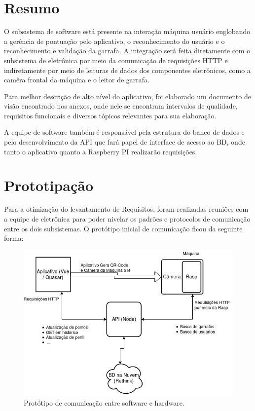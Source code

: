 \section{Resumo}
O subsistema de software está presente na interação máquina usuário englobando a gerência de pontuação pelo aplicativo, o reconhecimento do usuário e o reconhecimento e validação da garrafa. A integração será feita diretamente com o subsistema de eletrônica por meio da comunicação de requisições HTTP e indiretamente por meio de leituras de dados dos componentes eletrônicos, como a camêra frontal da máquina e o leitor de garrafa.

Para melhor descrição de alto nível do aplicativo, foi elaborado um documento de visão encontrado nos anexos, onde nele se encontram intervalos de qualidade, requisitos funcionais e diversos tópicos relevantes para sua elaboração.

A equipe de software também é responsável pela estrutura do banco de dados e pelo desenvolvimento da API que fará papel de interface de acesso ao BD, onde tanto o aplicativo quanto a Raspberry PI realizarão requisições.

\section{Prototipação}
Para a otimização do levantamento de Requisitos, foram realizadas reuniões com a equipe de eletrônica para poder nivelar os padrões e protocolos de comunicação entre os dois subsistemas. O protótipo inicial de comunicação ficou da seguinte forma:

\begin{figure}[!ht]
	\centering
		\includegraphics[scale=0.4]{figuras/software/1-prototipo-comunicacao.png}
	\caption{Protótipo de comunicação entre software e hardware.}
\end{figure}

